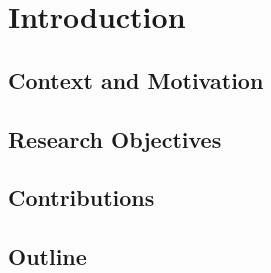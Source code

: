 \chapter{Introduction\label{chap:intro}}

\section{Context and Motivation\label{sec:intro.context}}



\section{Research Objectives\label{sec:intro.questions}}

\section{Contributions\label{sec:intro.contributions}}

\section{Outline\label{sec:intro.outline}}